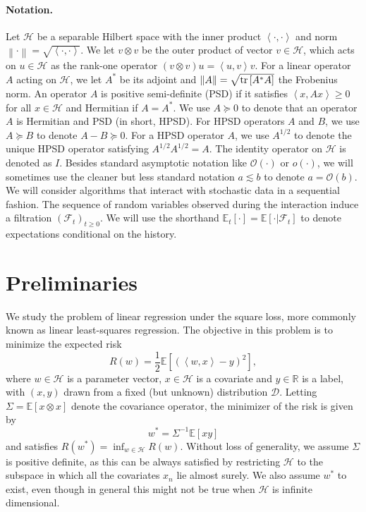 \documentclass[final,12pt]{colt2018} %
\newcommand{\F}{\mathcal{F}}
\newcommand{\real}{\mathbb{R}}
\newcommand{\HH}{\mathcal{H}}
\newcommand{\DD}{\mathcal{D}}
\newcommand{\OO}{\mathcal{O}}
\newcommand{\trace}[1]{\mbox{\normalfont tr}\left[#1\right]}
\newcommand{\EE}[1]{\mathbb{E}\left[#1\right]}
\newcommand{\EEt}[1]{\mathbb{E}_t\left[#1\right]}
\newcommand{\EEcc}[2]{\mathbb{E}\left[\left.#1\right|#2\right]}
\newcommand{\norm}[1]{\left\|#1\right\|}
\newcommand{\pa}[1]{\left(#1\right)}
\newcommand{\iprod}[2]{\left\langle#1, #2\right\rangle}
\begin{document}
\paragraph{Notation.}  Let $\HH$ be a separable Hilbert 
space with the inner product $\iprod{\cdot}{\cdot}$ and  norm $\norm{\cdot} = \sqrt{\iprod{\cdot}{\cdot}}$. We let 
$v\otimes v$ be the outer product of vector $v\in\HH$, which acts on $u\in\HH$ as the rank-one operator $\pa{v\otimes v}u = \iprod{u}{v}v$. 
For a linear operator $A$ acting on $\HH$,  we  let $A^*$ be  its adjoint and  $\norm{A} = 
\sqrt{\trace{A^*A}}$ the Frobenius norm. An operator $A$ is positive semi-definite (PSD) if it satisfies $\iprod{x}{Ax}\ge 0$ for all $x\in 
\HH$ and 
Hermitian if $A = A^*$.   We use $A\succcurlyeq 0$ to denote that an operator $A$ is Hermitian and PSD (in short, HPSD). For HPSD operators 
$A$ and $B$, we use $A\succcurlyeq B$ to denote $A - B \succcurlyeq 0$. For a HPSD operator $A$, we use $A^{1/2}$ to denote the unique
HPSD operator satisfying $A^{1/2}A^{1/2} = A$. The identity operator on $\HH$ is denoted as $I$. Besides standard asymptotic notation 
like $\OO\pa{\cdot}$ or $o\pa{\cdot}$, we will sometimes use the cleaner but less standard notation $a\lesssim b$ to denote $a = 
\OO\pa{b}$. We will consider algorithms that interact with stochastic data in a sequential fashion. The sequence of random variables 
observed during the interaction induce a filtration $\pa{\F_t}_{t\ge 0}$. We will use the shorthand $\EEt{\cdot} = \EEcc{\cdot}{\F_t}$ to 
denote expectations conditional on the history. 

\section{Preliminaries}\label{sec:pre}
We study the problem of linear regression under the square loss, more commonly known as linear  least-squares regression. The 
objective in this problem is to minimize the expected risk
\begin{equation}\label{LS}
 R(w) = \frac 12 \EE{\pa{\iprod{w}{x} - y}^2},
\end{equation}
where $w\in\HH$ is a parameter vector, $x\in\HH$ is a covariate and $y\in\real$ is a label, with $(x,y)$ drawn from a fixed (but unknown) 
distribution $\DD$. Letting 
$
 \Sigma = \EE{x\otimes x}
$
denote the covariance operator, the minimizer of the risk is given by
\begin{equation}\label{inverse}
 w^* = \Sigma^{-1} \EE{x y}
\end{equation}
and satisfies $R(w^*) = \inf_{w\in \HH} R(w)$. Without loss of generality, we assume $\Sigma$ is positive definite, as this can be always 
satisfied by restricting $\HH$ to the subspace in which all the covariates $x_n$ lie almost surely. 
We also assume $w^*$ to exist, even though in general this might not be true when $\HH$ is infinite dimensional.
\end{document}
